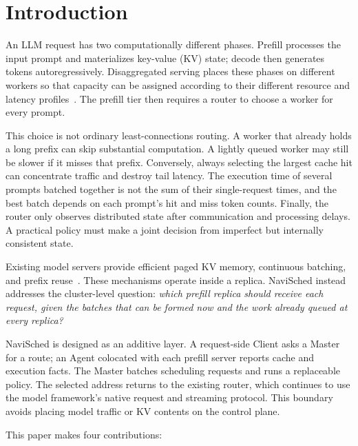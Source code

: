 \documentclass[10pt]{article}
\newcommand{\system}{NaviSched\xspace}
\begin{document}
\section{Introduction}

An LLM request has two computationally different phases. Prefill processes
the input prompt and materializes key-value (KV) state; decode then generates
tokens autoregressively. Disaggregated serving places these phases on
different workers so that capacity can be assigned according to their
different resource and latency profiles~\cite{distserve,splitwise,mooncake}.
The prefill tier then requires a router to choose a worker for every prompt.

This choice is not ordinary least-connections routing. A worker that already
holds a long prefix can skip substantial computation. A lightly queued worker
may still be slower if it misses that prefix. Conversely, always selecting the
largest cache hit can concentrate traffic and destroy tail latency. The
execution time of several prompts batched together is not the sum of their
single-request times, and the best batch depends on each prompt's hit and miss
token counts. Finally, the router only observes distributed state after
communication and processing delays. A practical policy must make a joint
decision from imperfect but internally consistent state.

Existing model servers provide efficient paged KV memory, continuous
batching, and prefix reuse~\cite{vllm,orca,sglang}. These mechanisms operate
inside a replica. \system instead addresses the cluster-level question:
\emph{which prefill replica should receive each request, given the batches
that can be formed now and the work already queued at every replica?}

\system is designed as an additive layer. A request-side Client asks a Master
for a route; an Agent colocated with each prefill server reports cache and
execution facts. The Master batches scheduling requests and runs a replaceable
policy. The selected address returns to the existing router, which continues
to use the model framework's native request and streaming protocol. This
boundary avoids placing model traffic or KV contents on the control plane.

This paper makes four contributions:
\end{document}
